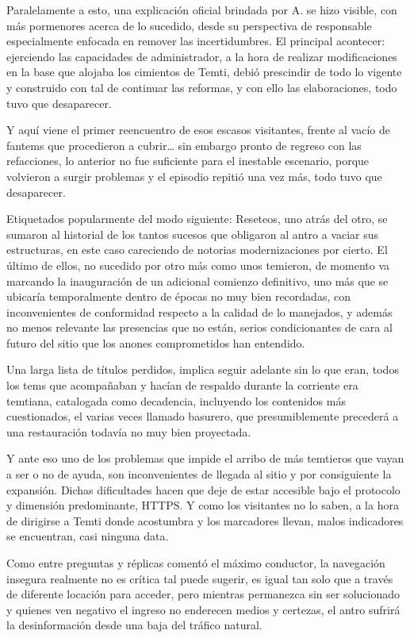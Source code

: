 \documentclass[
]{book}
\begin{document}
Paralelamente a esto, una explicación oficial brindada por A. se hizo visible, con más pormenores acerca de lo sucedido, desde su perspectiva de responsable especialmente enfocada en remover las incertidumbres. El principal acontecer: ejerciendo las capacidades de administrador, a la hora de realizar modificaciones en la base que alojaba los cimientos de Temti, debió prescindir de todo lo vigente y construido con tal de continuar las reformas, y con ello las elaboraciones, todo tuvo que desaparecer.

Y aquí viene el primer reencuentro de esos escasos visitantes, frente al vacío de fantems que procedieron a cubrir\ldots{} sin embargo pronto de regreso con las refacciones, lo anterior no fue suficiente para el inestable escenario, porque volvieron a surgir problemas y el episodio repitió una vez más, todo tuvo que desaparecer.

Etiquetados popularmente del modo siguiente: Reseteos, uno atrás del otro, se sumaron al historial de los tantos sucesos que obligaron al antro a vaciar sus estructuras, en este caso careciendo de notorias modernizaciones por cierto. El último de ellos, no sucedido por otro más como unos temieron, de momento va marcando la inauguración de un adicional comienzo definitivo, uno más que se ubicaría temporalmente dentro de épocas no muy bien recordadas, con inconvenientes de conformidad respecto a la calidad de lo manejados, y además no menos relevante las presencias que no están, serios condicionantes de cara al futuro del sitio que los anones comprometidos han entendido.

Una larga lista de títulos perdidos, implica seguir adelante sin lo que eran, todos los tems que acompañaban y hacían de respaldo durante la corriente era temtiana, catalogada como decadencia, incluyendo los contenidos más cuestionados, el varias veces llamado basurero, que presumiblemente precederá a una restauración todavía no muy bien proyectada.

Y ante eso uno de los problemas que impide el arribo de más temtieros que vayan a ser o no de ayuda, son inconvenientes de llegada al sitio y por consiguiente la expansión. Dichas dificultades hacen que deje de estar accesible bajo el protocolo y dimensión predominante, HTTPS. Y como los visitantes no lo saben, a la hora de dirigirse a Temti donde acostumbra y los marcadores llevan, malos indicadores se encuentran, casi ninguna data.

Como entre preguntas y réplicas comentó el máximo conductor, la navegación insegura realmente no es crítica tal puede sugerir, es igual tan solo que a través de diferente locación para acceder, pero mientras permanezca sin ser solucionado y quienes ven negativo el ingreso no enderecen medios y certezas, el antro sufrirá la desinformación desde una baja del tráfico natural.
\end{document}

